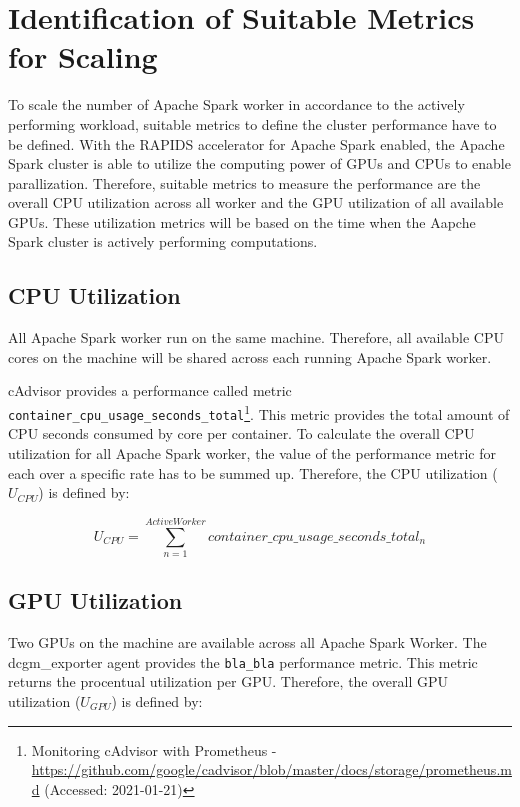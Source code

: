 \section{Identification of Suitable Metrics for Scaling}
To scale the number of Apache Spark worker in accordance to the actively performing workload, suitable metrics to define the cluster performance have to be defined.
With the RAPIDS accelerator for Apache Spark enabled, the Apache Spark cluster is able to utilize the computing power of GPUs and CPUs to enable parallization.
Therefore, suitable metrics to measure the performance are the overall CPU utilization across all worker and the GPU utilization of all available GPUs.
These utilization metrics will be based on the time when the Aapche Spark cluster is actively performing computations.


\subsection{CPU Utilization}
All Apache Spark worker run on the same machine. Therefore, all available CPU cores on the machine will be shared across each running Apache Spark worker.


cAdvisor provides a performance called metric \texttt{container\_cpu\_usage\_seconds\_total}\footnote{Monitoring cAdvisor with Prometheus - \url{https://github.com/google/cadvisor/blob/master/docs/storage/prometheus.md} (Accessed: 2021-01-21)}. This metric provides the total amount of CPU seconds consumed by core per container. 
To calculate the overall CPU utilization for all Apache Spark worker, the value of the performance metric for each over a specific rate has to be summed up. Therefore, the CPU utilization ($U_{CPU}$) is defined by:

\begin{equation}
U_{CPU}=\sum_{n=1}^{ActiveWorker}container\_cpu\_usage\_seconds\_total_{n}
\label{eq:formel}
\end{equation}

\subsection{GPU Utilization}
Two GPUs on the machine are available across all Apache Spark Worker.
The dcgm\_exporter agent provides the \texttt{bla\_bla} performance metric. This metric returns the procentual utilization per GPU.
Therefore, the overall GPU utilization ($U_{GPU}$) is defined by:


